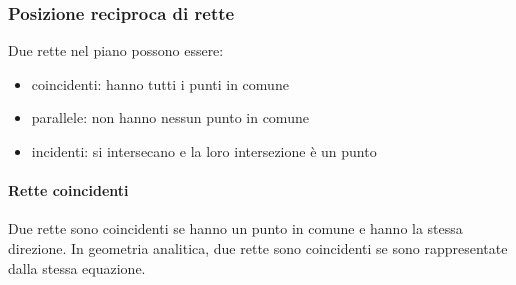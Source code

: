 \documentclass[letterpaper,10pt,english]{jupyterBook}
\begin{document}
\subsubsection{Posizione reciproca di rette}
\label{\detokenize{ch/analytic_geometry/analytic_geometry_2d/lines:posizione-reciproca-di-rette}}
\sphinxAtStartPar
Due rette nel piano possono essere:
\begin{itemize}
\item {} 
\sphinxAtStartPar
coincidenti: hanno tutti i punti in comune

\item {} 
\sphinxAtStartPar
parallele: non hanno nessun punto in comune

\item {} 
\sphinxAtStartPar
incidenti: si intersecano e la loro intersezione è un punto

\end{itemize}


\paragraph{Rette coincidenti}
\label{\detokenize{ch/analytic_geometry/analytic_geometry_2d/lines:rette-coincidenti}}
\sphinxAtStartPar
Due rette sono coincidenti se hanno un punto in comune e hanno la stessa direzione. In geometria analitica, due rette sono coincidenti se sono rappresentate dalla stessa equazione.
\end{document}
